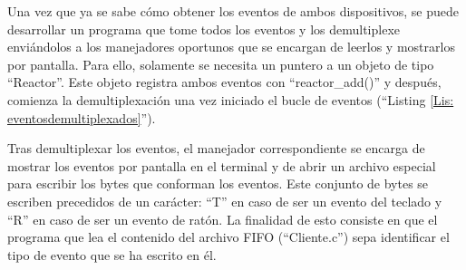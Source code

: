 Una vez que ya se sabe cómo obtener los eventos de ambos dispositivos, se puede desarrollar un programa que tome todos los eventos y los demultiplexe enviándolos a los manejadores oportunos que se encargan de leerlos y mostrarlos por pantalla. Para ello, solamente se necesita un puntero a un objeto de tipo ``Reactor''. Este objeto registra ambos eventos con ``reactor\_add()'' y después, comienza la demultiplexación una vez iniciado el bucle de eventos (``Listing \ref{Lis: eventosdemultiplexados}''). 

Tras demultiplexar los eventos, el manejador correspondiente se encarga de mostrar los eventos por pantalla en el terminal y de abrir un archivo especial para escribir los bytes que conforman los eventos. Este conjunto de bytes se escriben precedidos de un carácter: ``T'' en caso de ser un evento del teclado y ``R'' en caso de ser un evento de ratón. La finalidad de esto consiste en que el programa que lea el contenido del archivo FIFO (``Cliente.c'') sepa identificar el tipo de evento que se ha escrito en él.


    
